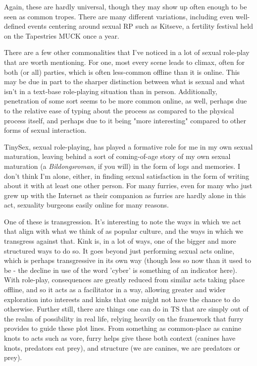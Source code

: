 Again, these are hardly universal, though they may show up often enough to be seen as common tropes. There are many different variations, including even well-defined events centering around sexual RP such as Kitseve, a fertility festival held on the Tapestries MUCK once a year.

There are a few other commonalities that I've noticed in a lot of sexual role-play that are worth mentioning. For one, most every scene leads to climax, often for both (or all) parties, which is often less-common offline than it is online. This may be due in part to the sharper distinction between what is sexual and what isn't in a text-base role-playing situation than in person. Additionally, penetration of some sort seems to be more common online, as well, perhaps due to the relative ease of typing about the process as compared to the physical process itself, and perhaps due to it being "more interesting" compared to other forms of sexual interaction.

TinySex, sexual role-playing, has played a formative role for me in my own sexual maturation, leaving behind a sort of coming-of-age story of my own sexual maturation (a \emph{Bildongsroman}, if you will) in the form of logs and memories. I don't think I'm alone, either, in finding sexual satisfaction in the form of writing about it with at least one other person. For many furries, even for many who just grew up with the Internet as their companion as furries are hardly alone in this act, sexuality burgeons easily online for many reasons.

One of these is transgression. It's interesting to note the ways in which we act that align with what we think of as popular culture, and the ways in which we transgress against that. Kink is, in a lot of ways, one of the bigger and more structured ways to do so. It goes beyond just performing sexual acts online, which is perhaps transgressive in its own way (though less so now than it used to be - the decline in use of the word 'cyber' is something of an indicator here). With role-play, consequences are greatly reduced from similar acts taking place offline, and so it acts as a facilitator in a way, allowing greater and wider exploration into interests and kinks that one might not have the chance to do otherwise. Further still, there are things one can do in TS that are simply out of the realm of possibility in real life, relying heavily on the framework that furry provides to guide these plot lines. From something as common-place as canine knots to acts such as vore, furry helps give these both context (canines have knots, predators eat prey), and structure (we are canines, we are predators or prey).

